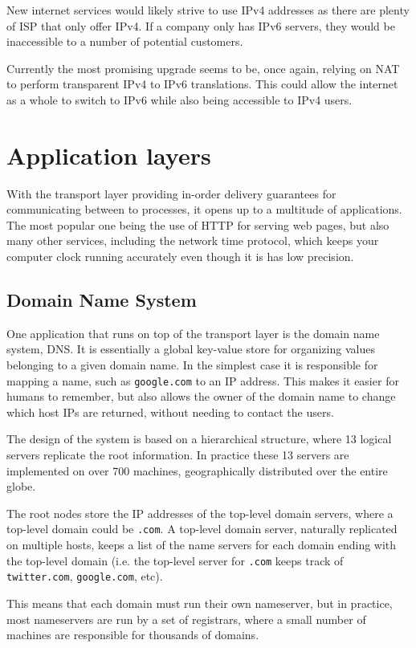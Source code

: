 New internet services would likely strive to use IPv4 addresses as there are plenty of ISP that only offer IPv4. If a company only has IPv6 servers, they would be inaccessible to a number of potential customers.

Currently the most promising upgrade seems to be, once again, relying on NAT to perform transparent IPv4 to IPv6 translations. This could allow the internet as a whole to switch to IPv6 while also being accessible to IPv4 users.

\section{Application layers}
With the transport layer providing in-order delivery guarantees for communicating between to processes, it opens up to a multitude of applications. The most popular one being the use of HTTP for serving web pages, but also many other services, including the network time protocol, which keeps your computer clock running accurately even though it is has low precision.

\subsection{Domain Name System}
One application that runs on top of the transport layer is the domain name system, DNS. It is essentially a global key-value store for organizing values belonging to a given domain name. In the simplest case it is responsible for mapping a name, such as \texttt{google.com} to an IP address. This makes it easier for humans to remember, but also allows the owner of the domain name to change which host IPs are returned, without needing to contact the users.

The design of the system is based on a hierarchical structure, where 13 logical servers replicate the root information. In practice these 13 servers are implemented on over 700 machines, geographically distributed over the entire globe.

The root nodes store the IP addresses of the top-level domain servers, where a top-level domain could be \texttt{.com}. A top-level domain server, naturally replicated on multiple hosts, keeps a list of the name servers for each domain ending with the top-level domain (i.e. the top-level server for \texttt{.com} keeps track of \texttt{twitter.com}, \texttt{google.com}, etc).

This means that each domain must run their own nameserver, but in practice, most nameservers are run by a set of registrars, where a small number of machines are responsible for thousands of domains. 

